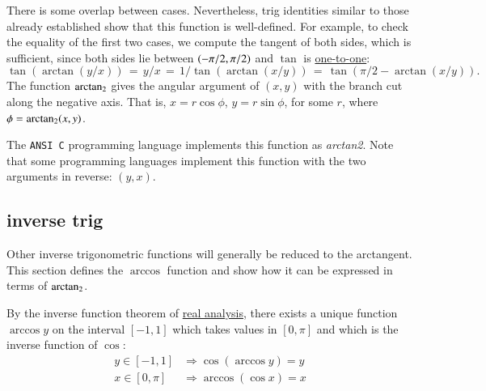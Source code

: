 There is some overlap between cases. Nevertheless, trig identities
similar to those already established show that this function is
well-defined.  For example, to check the equality of the first two
cases, we compute the tangent of both sides, which is sufficient,
since both sides lie between $(-\pi/2,\pi/2)$ and
$\tan$ is \hyperref[lemma:tan-monotone]{one-to-one}:
\begin{displaymath}
  \tan(\arctan(y/x)) \hyperref[def:arctan]{\,=\,} y/x \hyperref[def:arctan]{\,=\,} 
  1/\tan(\arctan(x/y)) \hyperref[lemma:cos-sin]{\,=\,} \tan(\pi/2 - \arctan(x/y)).
\end{displaymath}
The function ${\operatorname{arctan_2}}$ gives the angular argument of $(x,y)$ with the
branch cut along the negative axis.  That is, $x = r\cos\phi$,
$y=r\sin\phi$, for some $r$, where $\phi={\operatorname{arctan_2}}(x,y)$.

The {\tt ANSI C} programming language implements this function as {\it
  arctan2}.  Note that some programming languages implement this
function with the two arguments in reverse: $(y,x)$.
%
%
%
%


\subsection{inverse trig}
%
Other inverse trigonometric functions will generally be reduced to the
arctangent.  This section defines the $\arccos$ function and show how
it can be expressed in terms of ${\operatorname{arctan_2}}$.

\begin{definition}[arccos]
\label{def:arccos}
  By the inverse function theorem of \hyperref[back:analysis]{real
    analysis}, there exists a unique function $\arccos y$ on the
  interval $[-1,1]$ which takes values in $[0,\pi]$ and which is the
  inverse function of $\cos$:
\begin{displaymath}\begin{array}{lll}
y\in [-1,1] &\Rightarrow \cos(\arccos y) = y\\
x\in[0,\pi] &\Rightarrow \arccos(\cos x) = x
\end{array}\end{displaymath}
%
%
\end{definition}

